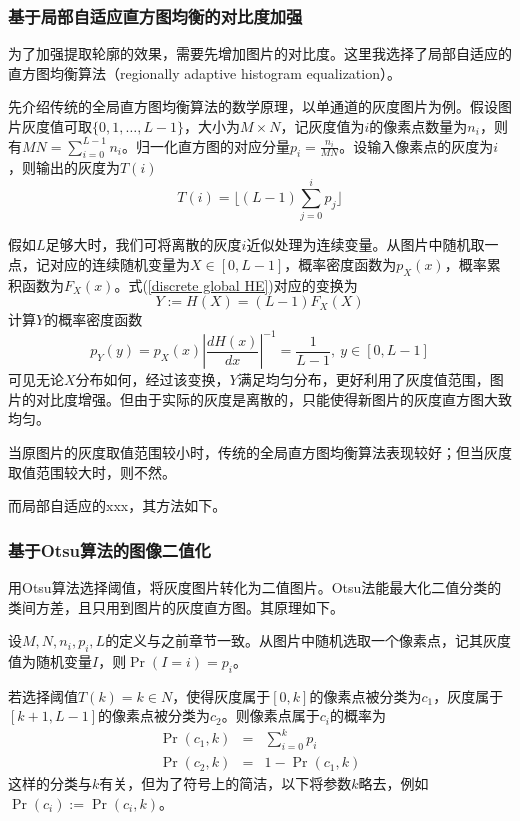 \subsubsection{基于局部自适应直方图均衡的对比度加强}
为了加强提取轮廓的效果，需要先增加图片的对比度。这里我选择了局部自适应的直方图均衡算法（regionally adaptive histogram equalization）。

先介绍传统的全局直方图均衡算法的数学原理，以单通道的灰度图片为例。假设图片灰度值可取$\{0, 1, \dots, L-1\}$，大小为$M\times N$，记灰度值为$i$的像素点数量为$n_i$，则有$MN=\sum_{i=0}^{L-1}n_i$。归一化直方图的对应分量$p_i=\frac{n_i}{MN}$。设输入像素点的灰度为$i$，则输出的灰度为$T(i)$
\begin{equation}
    T(i) = \lfloor (L-1) \sum_{j=0}^i p_j \rfloor
    \label{discrete global HE}
\end{equation}

假如$L$足够大时，我们可将离散的灰度$i$近似处理为连续变量。从图片中随机取一点，记对应的连续随机变量为$X\in[0,L-1]$，概率密度函数为$p_X(x)$，概率累积函数为$F_X(x)$。式(\ref{discrete global HE})对应的变换为
\begin{equation}
    Y:= H(X) = (L-1) F_X(X)
\end{equation}
计算$Y$的概率密度函数
\begin{equation}
    p_Y(y) = p_X(x) |\frac{dH(x)}{dx}|^{-1} = \frac{1}{L-1},\ y\in[0,L-1]
\end{equation} 
可见无论$X$分布如何，经过该变换，$Y$满足均匀分布，更好利用了灰度值范围，图片的对比度增强。但由于实际的灰度是离散的，只能使得新图片的灰度直方图大致均匀。

当原图片的灰度取值范围较小时，传统的全局直方图均衡算法表现较好；但当灰度取值范围较大时，则不然。

而局部自适应的xxx，其方法如下。

\subsubsection{基于Otsu算法的图像二值化}
用Otsu算法选择阈值，将灰度图片转化为二值图片。Otsu法能最大化二值分类的类间方差，且只用到图片的灰度直方图。其原理如下。

设$M,N,n_i,p_i,L$的定义与之前章节一致。从图片中随机选取一个像素点，记其灰度值为随机变量$I$，则$\Pr(I=i)=p_i$。

若选择阈值$T(k)=k\in N$，使得灰度属于$[0,k]$的像素点被分类为$c_1$，灰度属于$[k+1,L-1]$的像素点被分类为$c_2$。则像素点属于$c_i$的概率为
\begin{eqnarray}
    \Pr(c_1,k) &=& \sum_{i=0}^k p_i \\ 
    \Pr(c_2,k) &=& 1 - \Pr(c_1,k)
\end{eqnarray}
这样的分类与$k$有关，但为了符号上的简洁，以下将参数$k$略去，例如$\Pr(c_i):=\Pr(c_i,k)$。

